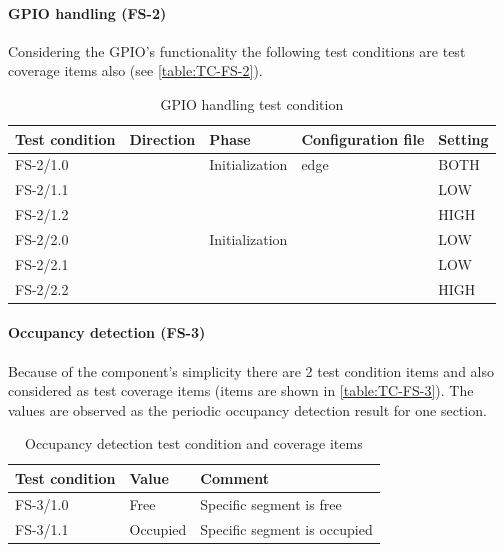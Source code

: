 \paragraph{GPIO handling (FS-2)}
Considering the GPIO's functionality the following test conditions are test coverage items also (see \autoref{table:TC-FS-2}).
\begin{table}[!h]
	\caption{GPIO handling test condition}
	\label{table:TC-FS-2}
	\begin{center}
		\renewcommand{\arraystretch}{1.8}
		\begin{tabu} 
			to 0.9 \textwidth
			{  X[c] X[c] X[c] X[c] X[c] }
			\toprule
			Test condition & Direction                     & Phase                            & Configuration file           & Setting \\ \midrule
			FS-2/1.0       &   & Initialization                   & edge                         & BOTH    \\
			FS-2/1.1       &                               &  &  & LOW     \\
			FS-2/1.2       &                               &                                  &                              & HIGH    \\
			FS-2/2.0       &  & Initialization                   &  & LOW     \\
			FS-2/2.1       &                               &  &                              & LOW    \\
			FS-2/2.2       &                               &                                  &                              & HIGH     \\ \bottomrule
		\end{tabu}
	\end{center}
\end{table} 

\paragraph{Occupancy detection (FS-3)}
Because of the component's simplicity there are 2 test condition items and also considered as test coverage items (items are shown in \autoref{table:TC-FS-3}). The values are observed as the periodic occupancy detection result for one section.
\begin{table}[!h]
	\caption{Occupancy detection test condition and coverage items}
	\label{table:TC-FS-3}
	\begin{center}
		\renewcommand{\arraystretch}{1.8}
		\begin{tabu} 
			to 0.9 \textwidth
			{  X[c] X[c] X[c] }
			\toprule
			Test condition & Value    & Comment             \\ \midrule
			FS-3/1.0       & Free     & Specific segment is free     \\
			FS-3/1.1       & Occupied & Specific segment is occupied \\ \bottomrule
		\end{tabu}
	\end{center}
\end{table}


